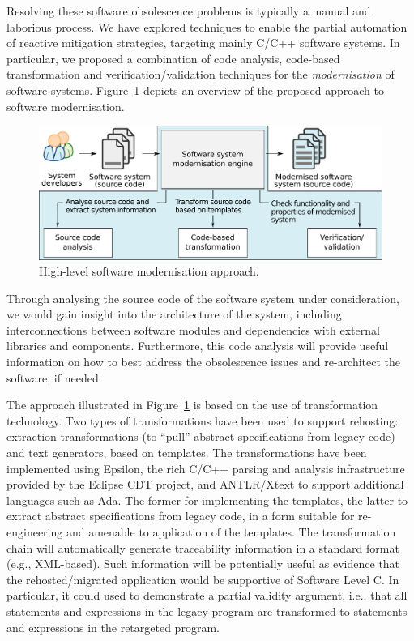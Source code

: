 \documentclass{llncs}
\begin{document}
Resolving these software obsolescence problems is typically a manual and laborious process. We have explored techniques to enable the partial 
automation of reactive mitigation strategies, targeting mainly C/C++ software 
systems. In particular, we proposed a combination of code analysis, code-based 
transformation and verification/validation techniques for the 
\textit{modernisation} of software systems.
Figure~\ref{fig:approach} depicts an overview of the proposed approach to 
software modernisation. 

\begin{figure}[htbp]
	\vspace*{-2em}
	\centering
	\includegraphics[width=.9\linewidth]{architecture.pdf}
	
	\caption{High-level software modernisation approach.}
	\label{fig:approach}
	
	\vspace*{-2em}
\end{figure}

Through analysing the source code of the software system under consideration, 
we would gain insight into the architecture of the system, including 
interconnections between software modules and dependencies with 
external libraries and components. Furthermore, this code analysis will provide 
useful information on how to best address the obsolescence issues and 
re-architect the software, if needed.

The approach illustrated in Figure~\ref{fig:approach} is based on the use of transformation technology.
Two types of transformations have been used to support rehosting: extraction 
transformations (to “pull” abstract specifications from legacy code) and text 
generators, based on templates. The transformations have been implemented using Epsilon, the rich C/C++ parsing and analysis 
infrastructure provided by the Eclipse CDT project, and ANTLR/Xtext to support 
additional languages 
such as Ada. The former for implementing the templates, the latter to extract 
abstract specifications from legacy code, in a form suitable for re-engineering 
and amenable to application of the templates. 
The transformation chain will automatically generate traceability 
information in a standard format (e.g., XML-based). Such information will be potentially useful as
evidence that the rehosted/migrated application would be supportive of Software Level C.
In particular, it could used to demonstrate a partial validity argument, 
i.e., that all statements and expressions in the legacy program are transformed 
to statements and expressions in the retargeted program. 
\end{document}
